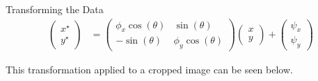 \documentclass[final]{beamer}
\newlength{\onecolwid}
\begin{document}
\begin{frame}[t]
\begin{columns}[t]
\begin{column}{\onecolwid}
\begin{block}{Transforming the Data}
\begin{align*}
  \begin{pmatrix}
    x^{\star} \\
    y^{\star}
\end{pmatrix} &= \begin{pmatrix}
\phi_{x}\cos(\theta) & \sin(\theta)\\
-\sin(\theta) & \phi_{y}\cos(\theta)
\end{pmatrix}  \begin{pmatrix}
    x \\
    y
\end{pmatrix} +   \begin{pmatrix}
    \psi_{x} \\
    \psi_{y}
\end{pmatrix}
\end{align*}


This transformation applied to a cropped image can be seen below.


\end{block}
\end{column}
\end{columns}
\end{frame}
\end{document}
